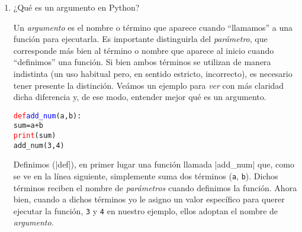 \documentclass{article}
\begin{document}
\begin{enumerate}
\item ¿Qué es un argumento en Python?
\par \hspace{5pt} Un \emph{argumento} es el nombre o término que aparece cuando ``llamamos'' a una función para ejecutarla. Es importante distinguirla del \emph{parámetro}, que corresponde más bien al término o nombre que aparece al inicio cuando ``definimos'' una función. Si bien ambos términos se utilizan de manera indistinta (un uso habitual pero, en sentido estricto, incorrecto), es necesario tener presente la distinción. Veámos un ejemplo para \emph{ver} con más claridad dicha diferencia y, de ese modo, entender mejor qué es un argumento.
\begin{tcolorbox}
\begin{alltt}
\textcolor{red}{def} \textcolor{blue}{add_num}(a, b):
    sum = a + b
    \textcolor{red}{print}(sum)
add_num(3, 4) 
\end{alltt}        
\end{tcolorbox}
\par \hspace{5pt} Definimos (\rverb|def|), en primer lugar una función llamada \bverb|add_num| que, como se ve en la línea siguiente, simplemente suma dos términos (\verb|a|, \verb|b|). Dichos términos reciben el nombre de \emph{parámetros} cuando definimos la función. Ahora bien, cuando a dichos términos yo le asigno un valor específico para querer ejecutar la función, \verb|3| y \verb|4| en nuestro ejemplo, ellos adoptan el nombre de \emph{argumento}. 
\vspace{0.5cm}


\end{enumerate}
\end{document}

